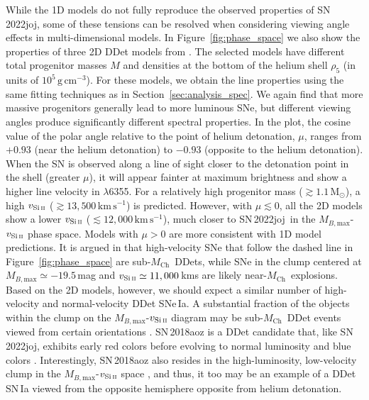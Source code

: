\documentclass[twocolumn]{aastex631}
\newcommand{\sn}{SN\,2022joj}
\newcommand{\Mch}{$M_\mathrm{Ch}$}
\newcommand{\kms}{$\mathrm{km}\,\mathrm{s}^{-1}$}
\newcommand{\chang}[1]{\textcolor{blue}{[Chang: #1]}}
\begin{document}
\begin{CJK*}{UTF8}{gbsn}
While the 1D models do not fully reproduce the observed properties of \sn, some of these tensions can be resolved when considering viewing angle effects in multi-dimensional models. In Figure~\ref{fig:phase_space} we also show the properties of three 2D DDet models from \citet{Shen_2D_2021}. The selected models have different total progenitor masses $M$ and densities at the bottom of the helium shell $\rho_5$ (in units of $\mathrm{10^5\,g\,cm^{-3}}$). For these models, we obtain the  line properties using the same fitting techniques as in Section~\ref{sec:analysis_spec}. We again find that more massive progenitors generally lead to more luminous SNe, but different viewing angles produce significantly different spectral properties. In the plot, the cosine value of the polar angle relative to the point of helium detonation, $\mu$, ranges from $+0.93$ (near the helium detonation) to $-0.93$ (opposite to the helium detonation). When the SN is observed along a line of sight closer to the detonation point in the shell (greater $\mu$), it will appear fainter at maximum brightness and show a higher line velocity in  $\lambda$6355. For a relatively high progenitor mass ($\gtrsim$$1.1\,\mathrm{M_\odot}$), a high $v_\mathrm{Si\,\textsc{ii}}$ ($\gtrsim$$13,500$\,\kms) is predicted. However, with $\mu\lesssim0$, all the 2D models show a lower $v_\mathrm{Si\,\textsc{ii}}$ ($\lesssim$$12,000$\,\kms), much closer to \sn\ in the $M_{B,\mathrm{max}}$-$v_\mathrm{Si\,\textsc{ii}}$ phase space. Models with $\mu>0$ are more consistent with 1D model predictions. It is argued in \citep{polin_observational_2019} that high-velocity SNe that follow the dashed line in Figure~\ref{fig:phase_space} are sub-\Mch\ DDets, while SNe in the clump centered at $M_{B,\mathrm{max}}\simeq-19.5$\,mag and $v_\mathrm{Si\,\textsc{ii}}\simeq11,000$\,kms are likely near-\Mch\ explosions. Based on the 2D models, however, we should expect a similar number of high-velocity and normal-velocity DDet SNe\,Ia. A substantial fraction of the objects within the clump on the $M_{B,\mathrm{max}}$-$v_\mathrm{Si\,\textsc{ii}}$ diagram may be sub-\Mch\ DDet events viewed from certain orientations \citep{Shen_2D_2021}. %
SN\,2018aoz is a DDet candidate that, like \sn, exhibits early red colors before evolving to normal luminosity and blue colors \citep{Ni_2022}. Interestingly, SN\,2018aoz also resides in the high-luminosity, low-velocity clump in the $M_{B,\mathrm{max}}$-$v_\mathrm{Si\,\textsc{ii}}$ space \citep{Ni_18aoz_2023}, and thus, it too may be an example of a DDet SN\,Ia viewed from the opposite hemisphere opposite from helium detonation.


\end{CJK*}
\end{document}

